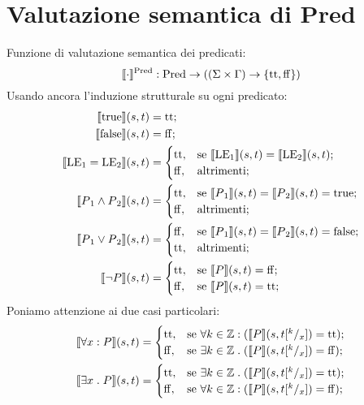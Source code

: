 \documentclass[a4paper, 12pt, oneside,fleqn]{book}
\begin{document}
\section{Valutazione semantica di Pred}
Funzione di valutazione semantica dei predicati:
$$\llbracket \cdot \rrbracket ^{\mathrm{Pred}}: \mathrm{Pred} \rightarrow ((\Sigma \times \Gamma) \rightarrow \{\mathrm{tt},\mathrm{ff} \})$$
Usando ancora l'induzione strutturale su ogni predicato:
\begin{align*}
   \llbracket \mathrm{true} \rrbracket(s,t) 
      &= \mathrm{tt};\\
   \llbracket \mathrm{false} \rrbracket(s,t) 
      &= \mathrm{ff};\\
   \llbracket \mathrm{LE}{_1} = \mathrm{LE}{_2}\rrbracket(s,t) 
      &=
        \begin{cases}
                \mathrm{tt}, &\text{se $\llbracket\mathrm{LE}{_1}\rrbracket(s,t) = \llbracket \mathrm{LE}{_2} \rrbracket(s,t)$};\\
                \mathrm{ff}, &\text{altrimenti};
        \end{cases}\\
    \llbracket P{_1} \wedge P{_2}\rrbracket(s,t) 
      &=
        \begin{cases}
                \mathrm{tt}, &\text{se $\llbracket P{_1}\rrbracket(s,t) = \llbracket P{_2}\rrbracket(s,t) = \mathrm{true}$};\\
                \mathrm{ff}, &\text{altrimenti};
        \end{cases}\\
    \llbracket P{_1} \vee P{_2}\rrbracket(s,t) 
      &=
        \begin{cases}
                \mathrm{ff}, &\text{se $\llbracket P{_1}\rrbracket(s,t) = \llbracket P{_2}\rrbracket(s,t) = \mathrm{false}$};   \\
                \mathrm{tt}, &\text{altrimenti};
        \end{cases} \\
    \llbracket \neg P\rrbracket(s,t) 
       &=
        \begin{cases}
                \mathrm{tt},&\text{se $\llbracket P\rrbracket(s,t) = \mathrm{ff}$};\\
                \mathrm{ff},&\text{se $\llbracket P\rrbracket(s,t) = \mathrm{tt}$};
        \end{cases}
\end{align*}
Poniamo attenzione ai due casi particolari:
\begin{align*}
   \llbracket\forall x \mathrel{:} P\rrbracket(s,t) 
      &=
        \begin{cases}
                \mathrm{tt}, &\text{se $\forall k\in\mathbb{Z}\mathrel{:}(\llbracket P\rrbracket(s,t[^k/_x]) = \mathrm{tt}$});\\
                \mathrm{ff}, &\text{se $\exists k\in\mathbb{Z}\mathrel{.}(\llbracket P\rrbracket(s,t[^k/_x]) = \mathrm{ff}$});
        \end{cases}\\
   \llbracket \exists x \mathrel{.} P\rrbracket(s,t) 
      &=
        \begin{cases}
                \mathrm{tt},  &\text{se $\exists k\in \mathbb{Z}\mathrel{.}(\llbracket P\rrbracket(s,t[^ k/_x]) = \mathrm{tt}$});\\
                \mathrm{ff},  &\text{se $\forall k\in \mathbb{Z}\mathrel{:}(\llbracket P\rrbracket(s,t[^k/_x]) = \mathrm{ff}$});
        \end{cases}
\end{align*}
\end{document}
